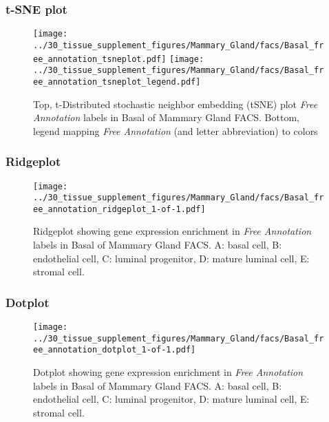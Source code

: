 \clearpage
\subsubsection{t-SNE plot}
\begin{figure}[h]
\centering
\texttt{[image: ../30\_tissue\_supplement\_figures/Mammary\_Gland/facs/Basal\_free\_annotation\_tsneplot.pdf]}
\texttt{[image: ../30\_tissue\_supplement\_figures/Mammary\_Gland/facs/Basal\_free\_annotation\_tsneplot\_legend.pdf]}
\caption{Top, t-Distributed stochastic neighbor embedding (tSNE) plot  \emph{Free Annotation} labels in Basal of Mammary Gland FACS. Bottom, legend mapping \emph{Free Annotation} (and letter abbreviation) to colors}
\end{figure}


\clearpage

\subsubsection{Ridgeplot}
\begin{figure}[h]
\centering
\texttt{[image: ../30\_tissue\_supplement\_figures/Mammary\_Gland/facs/Basal\_free\_annotation\_ridgeplot\_1-of-1.pdf]}

\caption{ Ridgeplot  showing gene expression enrichment in \emph{Free Annotation} labels in Basal of Mammary Gland FACS. A: basal cell, B: endothelial cell, C: luminal progenitor, D: mature luminal cell, E: stromal cell.}
\end{figure}


\clearpage

\subsubsection{Dotplot}
\begin{figure}[h]
\centering
\texttt{[image: ../30\_tissue\_supplement\_figures/Mammary\_Gland/facs/Basal\_free\_annotation\_dotplot\_1-of-1.pdf]}

\caption{ Dotplot  showing gene expression enrichment in \emph{Free Annotation} labels in Basal of Mammary Gland FACS. A: basal cell, B: endothelial cell, C: luminal progenitor, D: mature luminal cell, E: stromal cell.}
\end{figure}

